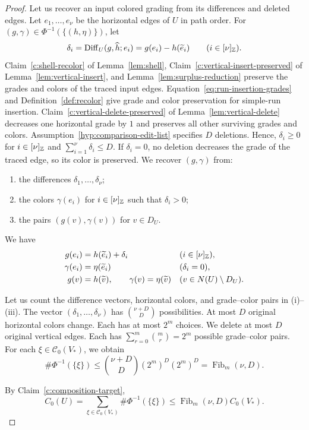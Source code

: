 \begin{proof}
Let us recover an input colored grading from its differences and deleted edges.
Let $e_1,\ldots,e_\nu$ be the horizontal edges of $U$ in path order.
For $(g,\gamma)\in\Phi^{-1}(\{(h,\eta)\})$, let
\[
 \delta_i=\operatorname{Diff}_U(g,\widehat h;e_i)
 =g(e_i)-h(\widetilde e_i)\qquad(i\in[\nu]_{\mathbb Z}).
\]
Claim~\ref{c:shell-recolor} of Lemma~\ref{lem:shell}, Claim~\ref{c:vertical-insert-preserved} of Lemma~\ref{lem:vertical-insert}, and Lemma~\ref{lem:surplus-reduction} preserve the grades and colors of the traced input edges.
Equation~\eqref{eq:run-insertion-grades} and Definition~\ref{def:recolor} give grade and color preservation for simple-run insertion.
Claim~\ref{c:vertical-delete-preserved} of Lemma~\ref{lem:vertical-delete} decreases one horizontal grade by $1$ and preserves all other surviving grades and colors.
Assumption~\ref{hyp:comparison-edit-list} specifies $D$ deletions.
Hence, $\delta_i\ge0$ for $i\in[\nu]_{\mathbb Z}$ and $\sum_{i=1}^{\nu}\delta_i\le D$.
If $\delta_i=0$, no deletion decreases the grade of the traced edge, so its color is preserved.
We recover $(g,\gamma)$ from:
\begin{enumerate}[label=(\roman*)]
\item the differences $\delta_1,\ldots,\delta_\nu$;
\item the colors $\gamma(e_i)$ for $i\in[\nu]_{\mathbb Z}$ such that $\delta_i>0$;
\item the pairs $(g(v),\gamma(v))$ for $v\in D_U$.
\end{enumerate}
We have
\[
\begin{aligned}
 g(e_i)&=h(\widetilde e_i)+\delta_i &&(i\in[\nu]_{\mathbb Z}),\\
 \gamma(e_i)&=\eta(\widetilde e_i) &&(\delta_i=0),\\
 g(v)&=h(\widetilde v),\qquad \gamma(v)=\eta(\widetilde v)
 &&(v\in N(U)\setminus D_U).
\end{aligned}
\]

Let us count the difference vectors, horizontal colors, and grade--color pairs in (i)--(iii).
The vector $(\delta_1,\ldots,\delta_\nu)$ has
$\binom{\nu+D}{D}$ possibilities. At most $D$
original horizontal colors change. Each has at most $2^m$ choices.
We delete at most $D$ original vertical edges. Each has
$\sum_{r=0}^m\binom mr=2^m$ possible grade--color pairs.
For each $\xi\in\mathcal C_0(V_*)$, we obtain
\[
 \#\Phi^{-1}(\{\xi\})\le\binom{\nu+D}{D}(2^m)^D(2^m)^D=\operatorname{Fib}_m(\nu,D).
\]

By Claim~\ref{c:composition-target},
\[
 C_0(U)=\sum_{\xi\in\mathcal C_0(V_*)}\#\Phi^{-1}(\{\xi\})
 \le \operatorname{Fib}_m(\nu,D)C_0(V_*).
\]
\end{proof}

